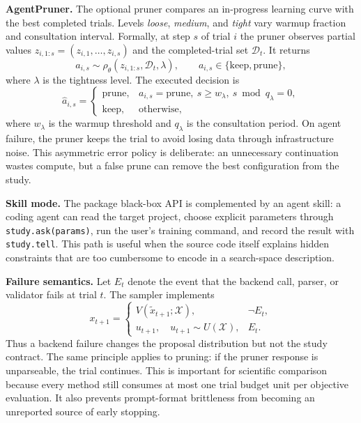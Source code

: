 \documentclass[letterpaper]{article}
\begin{document}
\textbf{AgentPruner.} The optional pruner compares an in-progress learning
curve with the best completed trials. Levels \emph{loose}, \emph{medium}, and
\emph{tight} vary warmup fraction and consultation interval. Formally, at step
$s$ of trial $i$ the pruner observes partial values
$z_{i,1:s}=(z_{i,1},\ldots,z_{i,s})$ and the completed-trial set
$\mathcal{D}_t$. It returns
\begin{equation}
  a_{i,s}\sim \rho_\theta(z_{i,1:s},\mathcal{D}_t,\lambda),
  \qquad
  a_{i,s}\in\{\mathrm{keep},\mathrm{prune}\},
\end{equation}
where $\lambda$ is the tightness level. The executed decision is
\begin{equation}
  \hat{a}_{i,s} =
  \begin{cases}
  \mathrm{prune}, & a_{i,s}=\mathrm{prune},\ s\ge w_\lambda,
  \ s\bmod q_\lambda=0,\\
  \mathrm{keep}, & \text{otherwise},
  \end{cases}
\end{equation}
where $w_\lambda$ is the warmup threshold and $q_\lambda$ is the consultation
period. On agent failure, the pruner keeps the trial to avoid losing data
through infrastructure noise. This asymmetric error policy is deliberate: an
unnecessary continuation wastes compute, but a false prune can remove the best
configuration from the study.

\textbf{Skill mode.} The package black-box API is complemented by an agent skill:
a coding agent can read the target project, choose explicit parameters through
\texttt{study.ask(params)}, run the user's training command, and record the
result with \texttt{study.tell}. This path is useful when the source code itself
explains hidden constraints that are too cumbersome to encode in a search-space
description.

\textbf{Failure semantics.} Let $E_t$ denote the event that the backend call,
parser, or validator fails at trial $t$. The sampler implements
\begin{equation}
  x_{t+1} =
  \begin{cases}
  V(\tilde{x}_{t+1};\mathcal{X}), & \neg E_t,\\
  u_{t+1},\quad u_{t+1}\sim U(\mathcal{X}), & E_t.
  \end{cases}
\end{equation}
Thus a backend failure changes the proposal distribution but not the study
contract. The same principle applies to pruning: if the pruner response is
unparseable, the trial continues. This is important for scientific comparison
because every method still consumes at most one trial budget unit per objective
evaluation. It also prevents prompt-format brittleness from becoming an
unreported source of early stopping.
\end{document}
